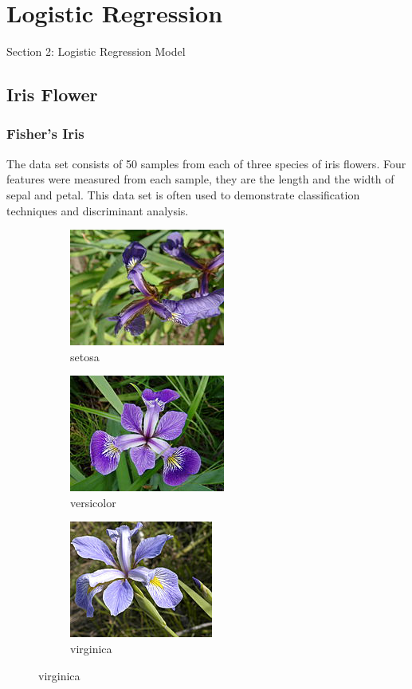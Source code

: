 \section{Logistic Regression} 

\begin{frame}
\huge{\centerline{Section 2: Logistic Regression Model}}
\end{frame}
\subsection{Iris Flower}
\begin{frame}
\frametitle{Fisher's Iris}
The data set consists of 50 samples from each of three 
species of iris flowers.  Four features were measured from each
sample, they are the length and the width of sepal and petal. This data set is often used
to demonstrate classification techniques and discriminant analysis.

\begin{figure}
\centering
\begin{subfigure}{.3\textwidth}
  \centering
  \includegraphics[scale=.45]{graphics/setosa}
  \caption{setosa}
  \label{fig:sub1}
\end{subfigure}%
\begin{subfigure}{.3\textwidth}
  \centering
  \includegraphics[scale=.45]{graphics/versicolor}
  \caption{versicolor}
  \label{fig:sub2}
\end{subfigure}
% 
\begin{subfigure}{.3\textwidth}
  \centering
  \includegraphics[scale=.45]{graphics/virginica}
  \caption{virginica}
  \label{fig:sub2}
\end{subfigure}
\label{fig:test}
\end{figure}



\end{frame}
